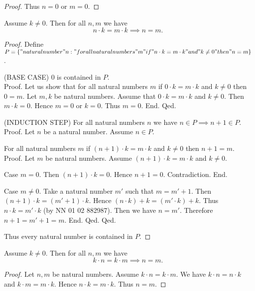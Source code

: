 \documentclass[../../natural-numbers.ftl.tex]{subfiles}
\begin{document}
\begin{forthel}
\begin{proof}
      Thus $n = 0$ or $m = 0$.
    \end{proof}


    \begin{proposition}[NN 01 03 799692]
      Assume $k \neq 0$.
      Then for all $n,m$ we have
      $$n \cdot k = m \cdot k \implies n = m.$$
    \end{proposition}
    \begin{proof}
      Define $P = \{ "natural number" n : "for all natural numbers" m "if" n \cdot k = m \cdot k "and" k \neq 0 "then" n = m \}$.

      (BASE CASE) $0$ is contained in $P$. \\
      Proof.
        Let us show that for all natural numbers $m$ if $0 \cdot k = m \cdot k$ and $k \neq 0$ then $0 = m$.
          Let $m,k$ be natural numbers.
          Assume that $0 \cdot k = m \cdot k$ and $k \neq 0$.
          Then $m \cdot k = 0$.
          Hence $m = 0$ or $k = 0$.
          Thus $m = 0$.
        End.
      Qed.

      (INDUCTION STEP) For all natural numbers $n$ we have $n \in P \implies n + 1 \in P$. \\
      Proof.
        Let $n$ be a natural number.
        Assume $n \in P$.

        For all natural numbers $m$ if $(n + 1) \cdot k = m \cdot k$ and $k \neq 0$ then $n + 1 = m$. \\
        Proof.
          Let $m$ be natural numbers.
          Assume $(n + 1) \cdot k = m \cdot k$ and $k \neq 0$.

          Case $m = 0$.
            Then $(n + 1) \cdot k = 0$.
            Hence $n + 1 = 0$.
            Contradiction.
          End.

          Case $m \neq 0$.
            Take a natural number $m'$ such that $m = m' + 1$.
            Then $(n + 1) \cdot k = (m' + 1) \cdot k$.
            Hence $(n \cdot k) + k = (m' \cdot k) + k$.
            Thus $n \cdot k = m' \cdot k$ (by NN 01 02 882987).
            Then we have $n = m'$.
            Therefore $n + 1 = m' + 1 = m$.
          End.
        Qed.
      Qed.

      Thus every natural number is contained in $P$.
    \end{proof}


    \begin{corollary}[NN 01 03 169506]
      Assume $k \neq 0$.
      Then for all $n,m$ we have
      $$k \cdot n = k \cdot m \implies n = m.$$
    \end{corollary}
    \begin{proof}
      Let $n,m$ be natural numbers.
      Assume $k \cdot n = k \cdot m$.
      We have $k \cdot n = n \cdot k$ and $k \cdot m = m \cdot k$.
      Hence $n \cdot k = m \cdot k$.
      Thus $n = m$.
    \end{proof}
  \end{forthel}
\end{document}
